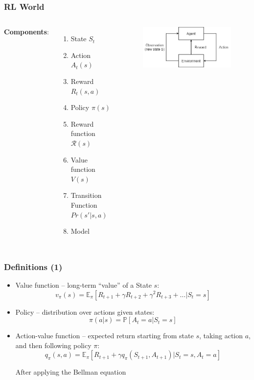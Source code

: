 \documentclass{beamer}
\begin{document}
\begin{frame}
\frametitle{RL World}
\begin{columns}[c] 
	
	\textbf{Components}:
	\begin{enumerate}
		\item State $S_t$
		\item Action $A_t(s)$
		\item Reward $R_t(s,a)$

		\item Policy $\pi(s)$
		\item Reward function $\mathcal{R}(s)$
		\item Value function $V(s)$

		\item Transition Function $Pr(s'|s,a)$
		\item Model

	\end{enumerate} 
	
	\begin{figure}
		\includegraphics[scale=0.45]{rlw}
	\end{figure}
	
\end{columns}
\end{frame}


\begin{frame}
\frametitle{Definitions (1)}
\begin{itemize}
	\item Value function -- long-term ``value'' of a State $s$:	
	$$v_{\pi}(s)=\mathbb{E}_{\pi}\left[R_{t+1}+\gamma R_{t+2}+\gamma^{2} R_{t+3}+\ldots | S_{t}=s\right]$$
	
	
	\item Policy -- distribution over actions given states:
	$$
	\pi(a | s)=\mathbb{P}\left[A_{t}=a | S_{t}=s\right]
	$$
	
	
	\item Action-value function --  expected return
	starting from state $s$, taking action $a$, 
	and then following policy $\pi$:
	$$
	q_{\pi}(s, a)=\mathbb{E}_{\pi}\left[R_{t+1}+\gamma q_{\pi}\left(S_{t+1}, A_{t+1}\right) | S_{t}=s, A_{t}=a\right]
	$$
	
	After applying the Bellman equation

\end{itemize}
\end{frame}
\end{document}
